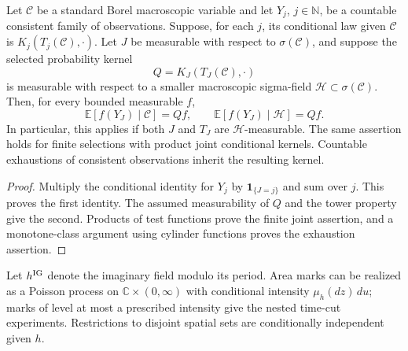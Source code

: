 \begin{lemma}
\label{loc:countable-selection}
Let $\mathcal C$ be a standard Borel macroscopic variable and let
$Y_j$, $j\in\mathbb N$, be a countable consistent family of observations.
Suppose, for each $j$, its conditional law given $\mathcal C$ is
$K_j(T_j(\mathcal C),\cdot)$.  Let $J$ be measurable with respect to
$\sigma(\mathcal C)$, and suppose the selected probability kernel
\[
                       Q=K_J(T_J(\mathcal C),\cdot)
\]
is measurable with respect to a smaller macroscopic sigma-field
$\mathcal H\subset\sigma(\mathcal C)$.  Then, for every bounded
measurable $f$,
\[
 \mathbb E[f(Y_J)\mid\mathcal C]=Qf,
 \qquad
 \mathbb E[f(Y_J)\mid\mathcal H]=Qf.
\]
In particular, this applies if both $J$ and $T_J$ are
$\mathcal H$-measurable.
The same assertion holds for finite selections with product joint
conditional kernels.  Countable exhaustions of consistent observations
inherit the resulting kernel.
\end{lemma}
\begin{proof}
Multiply the conditional identity for $Y_j$ by
$\mathbf 1_{\{J=j\}}$ and sum over $j$.  This proves the first identity.
The assumed measurability of $Q$ and the tower property give the second.
Products of test functions prove the finite joint assertion, and a
monotone-class argument using cylinder functions proves the exhaustion
assertion.
\end{proof}

Let $h^{\rm IG}$ denote the imaginary field modulo its period.  Area
marks can be realized as a Poisson process on
$\mathbb C\times(0,\infty)$ with conditional intensity
$\mu_h(dz)\,du$; marks of level at most a prescribed intensity give the
nested time-cut experiments.  Restrictions to disjoint spatial sets are
conditionally independent given $h$.

